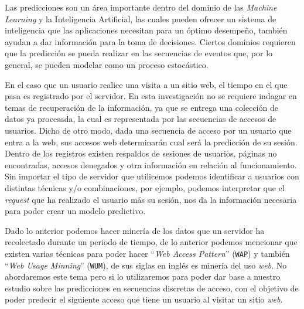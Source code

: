Las predicciones son un área importante dentro del dominio de las \emph{Machine Learning} y la Inteligencia Artificial, las cuales pueden ofrecer un sistema de inteligencia que las aplicaciones necesitan para un óptimo desempeño, también ayudan a dar información para la toma de decisiones. Ciertos dominios requieren que la predicción se pueda realizar en las secuencias de eventos que, por lo general, se pueden modelar como un proceso estocástico. 



En el caso  que un usuario realice una visita a un sitio web, el tiempo en el que pasa es registrado por el servidor. En esta investigación no se requiere indagar en temas de recuperación de la información, ya que se entrega una colección de datos ya procesada, la cual es representada por las secuencias de accesos de usuarios. 
Dicho de otro modo, dada una secuencia de acceso por un usuario que entra a la web, sus accesos web determinarán cual será la predicción de su sesión. Dentro de los registros existen respaldos de sesiones de usuarios, páginas no encontradas, accesos denegados y otra información en relación al funcionamiento. Sin importar el tipo de servidor que utilicemos podemos identificar a usuarios con distintas técnicas y/o combinaciones, por ejemplo, podemos interpretar que el \emph{request} que ha realizado el usuario más su sesión, nos da la información necesaria para poder crear un modelo predictivo. 

Dado lo anterior podemos hacer minería de los datos que un servidor ha recolectado durante un periodo de tiempo, de lo anterior  podemos mencionar que existen varias técnicas para poder hacer ``\emph{Web Access Pattern}'' (\texttt{WAP}) y también ``\emph{Web Usage Minning}'' (\texttt{WUM}), de sus siglas en inglés es minería del uso \emph{web}. No abordaremos este tema pero si lo utilizaremos para poder dar base a nuestro estudio sobre las predicciones en secuencias discretas de acceso, con el objetivo de poder predecir el siguiente acceso que tiene un usuario al visitar un sitio \emph{web}.


